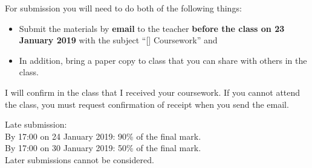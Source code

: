 For submission you will need to do both of the following things:
\begin{itemize}
    \item Submit the materials by \textbf{email} to the teacher \textbf{before the class on 23 January 2019} with the subject ``[\coursenospace] Coursework'' and
    \item In addition, bring a paper copy to class that you can share with others in the class.
\end{itemize}

I will confirm in the class that I received your coursework. If you cannot attend the class, you must request confirmation of receipt when you send the email.

Late submission:\\
By 17:00 on 24 January 2019: 90\% of the final mark.\\
By 17:00 on 30 January 2019: 50\% of the final mark.\\
Later submissions cannot be considered.
